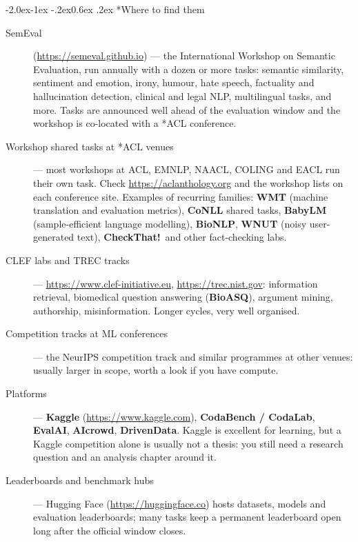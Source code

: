 \documentclass[11pt,a4paper]{article}
\makeatletter
\renewcommand\subsubsection{\@startsection{subsubsection}{3}{\z@}%
  {-2.0ex\@plus -1ex \@minus -.2ex}{0.6ex \@plus .2ex}%
  {\normalfont\normalsize\bfseries\color{ink}}}
\makeatother
\begin{document}
\subsubsection*{Where to find them}

\begin{description}
  \item[SemEval] (\url{https://semeval.github.io}) --- the International
        Workshop on Semantic Evaluation, run annually with a dozen or more
        tasks: semantic similarity, sentiment and emotion, irony, humour,
        hate speech, factuality and hallucination detection, clinical and
        legal NLP, multilingual tasks, and more. Tasks are announced well
        ahead of the evaluation window and the workshop is co-located with a
        \mbox{*ACL} conference.
  \item[Workshop shared tasks at *ACL venues] --- most workshops at ACL,
        EMNLP, NAACL, COLING and EACL run their own task. Check
        \url{https://aclanthology.org} and the workshop lists on each
        conference site. Examples of recurring families: \textbf{WMT}
        (machine translation and evaluation metrics), \textbf{CoNLL} shared
        tasks, \textbf{BabyLM} (sample-efficient language modelling),
        \textbf{BioNLP}, \textbf{WNUT} (noisy user-generated text),
        \textbf{CheckThat!}~and other fact-checking labs.
  \item[CLEF labs and TREC tracks] --- \url{https://www.clef-initiative.eu},
        \url{https://trec.nist.gov}: information retrieval, biomedical
        question answering (\textbf{BioASQ}), argument mining, authorship,
        misinformation. Longer cycles, very well organised.
  \item[Competition tracks at ML conferences] --- the NeurIPS competition
        track and similar programmes at other venues: usually larger in scope,
        worth a look if you have compute.
  \item[Platforms] --- \textbf{Kaggle} (\url{https://www.kaggle.com}),
        \textbf{CodaBench / CodaLab}, \textbf{EvalAI},
        \textbf{AIcrowd}, \textbf{DrivenData}. Kaggle is excellent for
        learning, but a Kaggle competition alone is usually not a thesis:
        you still need a research question and an analysis chapter around it.
  \item[Leaderboards and benchmark hubs] --- Hugging Face
        (\url{https://huggingface.co}) hosts datasets, models and evaluation
        leaderboards; many tasks keep a permanent leaderboard open long after
        the official window closes.
\end{description}
\end{document}
